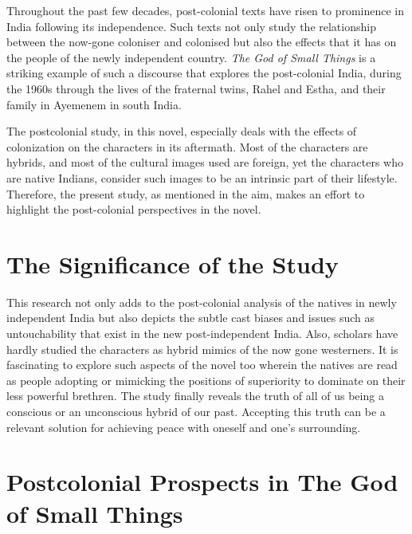 Throughout  the  past  few  decades,  post-colonial  texts  have  risen  to  prominence  in  India  following  its  independence.  Such  texts  not  only  study  the  relationship  between  the  now-gone  coloniser  and  colonised  but  also  the  effects  that  it  has  on  the  people  of  the  newly  independent  country.  \emph{The  God  of  Small  Things}  is  a  striking  example  of  such  a  discourse  that  explores  the  post-colonial  India,  during  the  1960s  through  the  lives  of  the  fraternal  twins,  Rahel  and  Estha,  and  their  family  in  Ayemenem  in  south  India.

The  postcolonial  study,  in  this  novel,  especially  deals  with  the  effects  of  colonization  on  the  characters  in  its  aftermath.  Most  of  the  characters  are  hybrids,  and  most  of  the  cultural  images  used  are  foreign,  yet  the  characters  who  are  native  Indians,  consider  such  images  to  be  an  intrinsic  part  of  their  lifestyle.  Therefore,  the  present  study,  as  mentioned  in  the  aim,  makes  an  effort  to  highlight  the  post-colonial  perspectives  in  the  novel.

\section{The Significance of the Study}

This  research  not  only  adds  to  the  post-colonial  analysis  of  the  natives  in  newly  independent  India  but  also  depicts  the  subtle  cast  biases  and  issues  such  as  untouchability  that  exist  in  the  new  post-independent  India.  Also,  scholars  have  hardly  studied  the  characters  as  hybrid  mimics  of  the  now  gone  westerners.  It  is  fascinating  to  explore  such  aspects  of  the  novel  too  wherein  the  natives  are  read  as  people  adopting  or  mimicking  the  positions  of  superiority  to  dominate  on  their  less  powerful  brethren.  The  study  finally  reveals  the  truth  of  all  of  us  being  a  conscious  or  an  unconscious  hybrid  of  our  past.  Accepting  this  truth  can  be  a  relevant  solution  for  achieving  peace  with  oneself  and  one’s  surrounding.

\section{Postcolonial Prospects in The God of Small Things}

